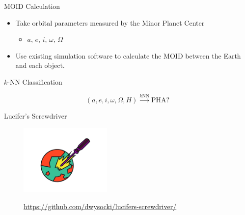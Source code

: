 \documentclass{beamer}
\begin{document}
\begin{frame}{MOID Calculation}

  \begin{itemize}
  \item Take orbital parameters measured by the Minor Planet Center
    \begin{itemize}
    \item $a$, $e$, $i$, $\omega$, $\Omega$
    \end{itemize}
  \item Use existing simulation software to calculate the MOID between
    the Earth and each object.
  \end{itemize}

\end{frame}


\begin{frame}{$k$-NN Classification}

{
  \Large
  \begin{displaymath}
    (a, e, i, \omega, \Omega, H) \overset{k\mathrm{NN}}{\to} \mathrm{PHA?}
  \end{displaymath}
}

\end{frame}


\begin{frame}{Lucifer's Screwdriver}

  \begin{figure}[ht]
    \centering
    \includegraphics[width=0.4\textwidth]{img/lucifiers-screwdriver-logo}

    \url{https://github.com/dwysocki/lucifers-screwdriver/}
  \end{figure}

  \vfill

\end{frame}
\end{document}

